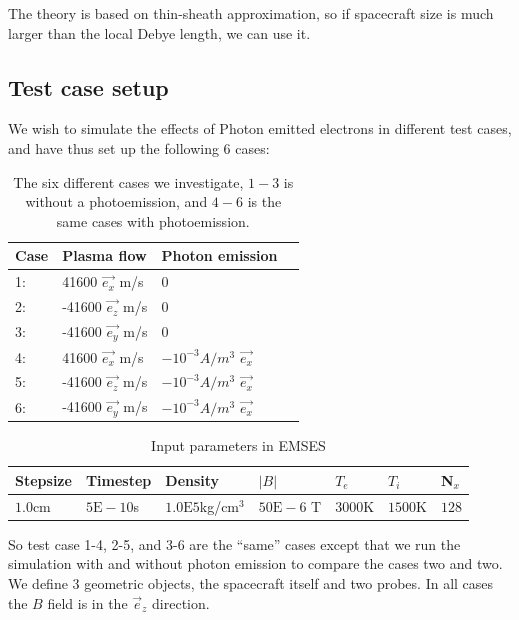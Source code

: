 The theory is based on thin-sheath approximation, so if spacecraft size is much larger than the local Debye length, we can use it.\\

\subsection{Test case setup}

We wish to simulate the effects of Photon emitted electrons in different test cases, and have thus set up the following
6 cases:
\begin{table}
\begin{center}
    \begin{tabular}{ | l | l | l | p{5cm} |}
    \hline
    Case & Plasma flow & Photon emission  \\ \hline
     1: & 41600 $\vec{e_x}$ m/s  & 0 \\ \hline
     2: & -41600 $\vec{e_z}$ m/s & 0 \\ \hline
     3: & -41600 $\vec{e_y}$ m/s & 0 \\ \hline
     4: & 41600 $\vec{e_x}$ m/s & $-10^{-3} A/m^{3}$ $\vec{e_x}$\\ \hline
     5: & -41600 $\vec{e_z}$ m/s & $-10^{-3} A/m^{3}$ $\vec{e_x}$\\ \hline
     6: & -41600 $\vec{e_y}$ m/s & $-10^{-3} A/m^{3}$  $\vec{e_x}$\\
    \hline
    \end{tabular}
\end{center}
	\caption{The six different cases we investigate, \(1-3\) is without a photoemission, and \(4-6\) is the same cases with photoemission.}
\end{table}

	\begin{table}[h]
		\centering
	    \begin{tabular}{ | l | l | l| l| l | l | l |}
	    \hline
		Stepsize & Timestep & Density &\(|B|\) & \(T_e\) & \(T_i\) & N\(_x\)\\
		\hline
		\(1.0\)cm & \(5\text{E}-10\)s & \(1.0\text{E}5\)kg/cm\(^3\) &  \(50\text{E}-6\) T & \(3000\)K & \(1500\)K  & \(128\)\\
	    \hline
	    \end{tabular}
		\caption{Input parameters in EMSES}
	\end{table}

So test case 1-4, 2-5, and 3-6 are the ``same'' cases except that we run the simulation with and without
photon emission to compare the cases two and two. We define 3 geometric objects, the spacecraft itself
and two probes. In all cases the $B$ field is in the $\vec e_z$ direction.

